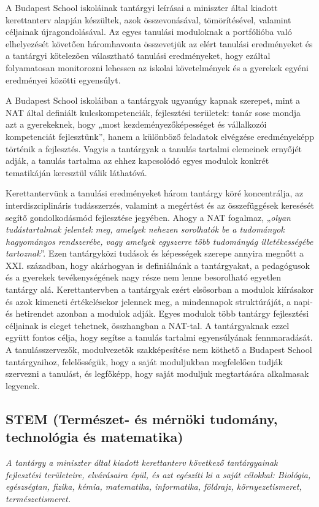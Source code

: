 A Budapest School iskoláinak tantárgyi leírásai a miniszter által kiadott
kerettanterv alapján készültek, azok összevonásával, tömörítésével, valamint
céljainak újragondolásával. Az egyes tanulási moduloknak a portfólióba való
elhelyezését követően háromhavonta összevetjük az elért tanulási eredményeket és 
a tantárgyi kötelezően választható tanulási eredményeket, hogy ezáltal folyamatosan monitorozni lehessen
az iskolai követelmények és a gyerekek egyéni eredményei közötti egyensúlyt.

A Budapest School iskoláiban a tantárgyak ugyanúgy kapnak szerepet, mint a NAT
által definiált kulcskompetenciák, fejlesztési területek: tanár sose mondja azt a gyerekeknek, hogy „most
kezdeményezőképességet és vállalkozói kompetenciát fejlesztünk'', hanem a
különböző feladatok elvégzése eredményeképp történik a fejlesztés. Vagyis a
tantárgyak a tanulás tartalmi elemeinek ernyőjét adják, a tanulás tartalma az
ehhez kapcsolódó egyes modulok konkrét tematikáján keresztül válik láthatóvá.

Kerettantervünk a tanulási eredményeket három tantárgy köré koncentrálja, az interdiszciplináris
tudásszerzés, valamint a megértést és az összefüggések keresését segítő
gondolkodásmód fejlesztése jegyében. Ahogy a NAT fogalmaz, „\emph{olyan
tudástartalmak jelentek meg, amelyek nehezen sorolhatók be a tudományok
hagyományos rendszerébe, vagy amelyek egyszerre több tudományág illetékességébe
tartoznak}''. Ezen tantárgyközi tudások és képességek szerepe annyira megnőtt a
XXI. században, hogy akárhogyan is definiálnánk a tantárgyakat, a pedagógusok
és a gyerekek tevékenységének nagy része nem lenne besorolható egyetlen tantárgy
alá. Kerettantervben a tantárgyak ezért elsősorban a modulok kiírásakor és azok
kimeneti értékelésekor jelennek meg, a mindennapok struktúráját, a napi- és
hetirendet azonban a modulok adják. Egyes modulok több tantárgy fejlesztési
céljainak is eleget tehetnek, összhangban a NAT-tal. A tantárgyaknak ezzel
együtt fontos célja, hogy segítse a tanulás tartalmi egyensúlyának
fennmaradását. A tanulásszervezők, modulvezetők szakképesítése nem köthető a Budapest
School tantárgyaihoz, felelősségük, hogy a saját moduljukban megfelelően tudják
szervezni a tanulást, és legfőképp, hogy saját moduljuk megtartására alkalmasak
legyenek.

\subsection[STEM]{STEM	(Természet- és mérnöki	tudomány, technológia és
  matematika)}
\emph{A tantárgy a miniszter által kiadott kerettanterv következő tantárgyainak
  fejlesztési területeire, elvárásaira épül, és azt egészíti ki a saját célokkal:
  Biológia, egészségtan, fizika, kémia, matematika, informatika, földrajz,
  környezetismeret, természetismeret.}

